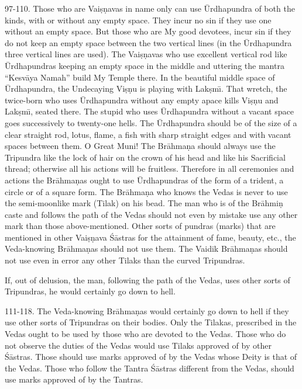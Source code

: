 97-110. Those who are Vai\d{s}\d{n}avas in name only can use \=Urdhapundra of both the kinds, with or without any empty space. They incur no sin if they use one without an empty space. But those who are My good devotees, incur sin if they do not keep an empty space between the two vertical lines (in the \=Urdhapundra three vertical lines are used). The Vai\d{s}\d{n}avas who use excellent vertical rod like \=Urdhapundras keeping an empty space in the middle and uttering the mantra ``Kesv\=aya Namah'' build My Temple there. In the beautiful middle space of \=Urdhapundra, the Undecaying Vi\d{s}\d{n}u is playing with Lak\d{s}m\={\i}. That wretch, the twice-born who uses \=Urdhapundra without any empty apace kills Vi\d{s}\d{n}u and Lak\d{s}m\={\i}, seated there. The stupid who uses \=Urdhapundra without a vacant space goes successively to twenty-one hells. The \=Urdhapundra should be of the size of a clear straight rod, lotus, flame, a fish with sharp straight edges and with vacant spaces between them. O Great Muni! The Br\=ahma\d{n}a should always use the Tripundra like the lock of hair on the crown of his head and like his Sacrificial thread; otherwise all his actions will be fruitless. Therefore in all ceremonies and actions the Br\=ahma\d{n}as ought to use \=Urdhapundras of the form of a trident, a circle or of a square form. The Br\=ahma\d{n}a who knows the Vedas is never to use the semi-moonlike mark (Tilak) on his bead. The man who is of the Br\=ahmi\d{n} caste and follows the path of the Vedas should not even by mistake use any other mark than those above-mentioned. Other sorts of pundras (marks) that are mentioned in other Vai\d{s}\d{n}ava \'S\=astras for the attainment of fame, beauty, etc., the Veda-knowing Br\=ahma\d{n}as should not use them. The Vaidik Br\=ahma\d{n}as should not use even in error any other Tilaks than the curved Tripundras.

If, out of delusion, the man, following the path of the Vedas, uses other sorts of Tripundras, he would certainly go down to hell.

111-118. The Veda-knowing Br\=ahma\d{n}as would certainly go down to hell if they use other sorts of Tripundras on their bodies. Only the Tilakas, prescribed in the Vedas ought to be used by those who are devoted to the Vedas. Those who do not observe the duties of the Vedas would use Tilaks approved of by other \'S\=astras. Those should use marks approved of by the Vedas whose Deity is that of the Vedas. Those who follow the Tantra \'S\=astras different from the Vedas, should use marks approved of by the Tantras.

